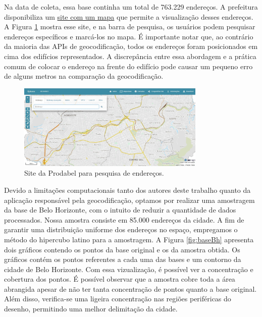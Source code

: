Na data de coleta, essa base continha um total de 763.229 endereços. A prefeitura disponibiliza um \href{https://bhmap.pbh.gov.br}{site com um mapa} que permite a visualização desses endereços. A Figura \ref{fig:siteProdabel} mostra esse site, e na barra de pesquisa, os usuários podem pesquisar endereços específicos e marcá-los no mapa. É importante notar que, ao contrário da maioria das APIs de geocodificação, todos os endereços foram posicionados em cima dos edifícios representados. A discrepância entre essa abordagem e a prática comum de colocar o endereço na frente do edifício pode causar um pequeno erro de alguns metros na comparação da geocodificação.

\begin{figure}
    \centering
    \includegraphics[width=0.8\textwidth]{Figuras/siteProdabel.jpeg}
    \caption{Site da Prodabel para pesquisa de endereços. }
    \label{fig:siteProdabel}
\end{figure}

Devido a limitações computacionais tanto dos autores deste trabalho quanto da aplicação responsável pela geocodificação, optamos por realizar uma amostragem da base de Belo Horizonte, com o intuito de reduzir a quantidade de dados processados. Nossa amostra consiste em 85.000 endereços da cidade. A fim de garantir uma distribuição uniforme dos endereços no espaço, empregamos o método do hipercubo latino para a amostragem. A Figura \ref{fig:baseBh} apresenta dois gráficos contendo os pontos da base original e os da amostra obtida. Os gráficos contém os pontos referentes a cada uma das bases e um contorno da cidade de Belo Horizonte. Com essa vizualização, é possível ver a concentração e cobertura dos pontos. É possível observar que a amostra cobre toda a área abrangida apesar de não ter tanta concentração de pontos quanto a base original. Além disso, verifica-se uma ligeira concentração nas regiões periféricas do desenho, permitindo uma melhor delimitação da cidade.

